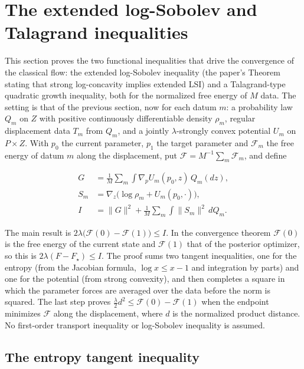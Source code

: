 \documentclass[11pt,a4paper]{report}
\begin{document}
\section{\texorpdfstring{The extended log-Sobolev and Talagrand inequalities}{The extended log-Sobolev and Talagrand inequalities}}


This section proves the two functional inequalities that drive the convergence of the classical flow: the extended log-Sobolev inequality (the paper's Theorem stating that strong log-concavity implies extended LSI) and a Talagrand-type quadratic growth inequality, both for the normalized free energy of \(M\) data. The setting is that of the previous section, now for each datum \(m\): a probability law \(Q_m\) on \(Z\) with positive continuously differentiable density \(\rho_{m}\), regular displacement data \(T_m\) from \(Q_m\), and a jointly \(\lambda\)-strongly convex potential \(U_m\) on \(P\times Z\). With \(p_0\) the current parameter, \(p_1\) the target parameter and \(\mathcal F_m\) the free energy of datum \(m\) along the displacement, put \(\mathcal F=M^{-1}\sum_m\mathcal F_m\), and define


\[\begin{aligned}G&=\frac1M\sum_m\int\nabla_pU_m(p_0,z)\,Q_m(dz),\\ S_m&=\nabla_z\bigl(\log\rho_m+U_m(p_0,\cdot)\bigr),\\I&=\|G\|^2+\frac1M\sum_m\int\|S_m\|^2\,dQ_m.\end{aligned}\]


The main result is \(2\lambda\bigl(\mathcal F(0)-\mathcal F(1)\bigr)\le I\). In the convergence theorem \(\mathcal F(0)\) is the free energy of the current state and \(\mathcal F(1)\) that of the posterior optimizer, so this is \(2\lambda(F-F_\star)\le I\). The proof sums two tangent inequalities, one for the entropy (from the Jacobian formula, \(\log x\le x-1\) and integration by parts) and one for the potential (from strong convexity), and then completes a square in which the parameter forces are averaged over the data before the norm is squared. The last step proves \(\frac\lambda2d^2\le\mathcal F(0)-\mathcal F(1)\) when the endpoint minimizes \(\mathcal F\) along the displacement, where \(d\) is the normalized product distance. No first-order transport inequality or log-Sobolev inequality is assumed.

\subsection{\texorpdfstring{The entropy tangent inequality}{The entropy tangent inequality}}
\end{document}
